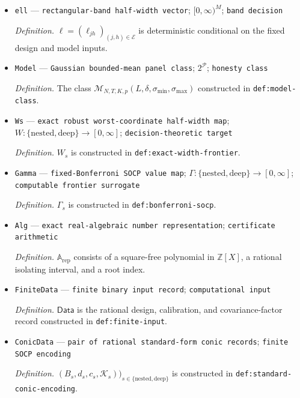 \documentclass{article}
\begin{document}
\begin{itemize}
  \par\smallskip\noindent\emph{Definition.} \(c_\alpha=\sup_{m\ge1}\{\Phi^{-1}(1-\alpha/(2m))+1\}/q_\alpha(m)\).
  \item \texttt{ell} --- \texttt{rectangular-\allowbreak{}band half-\allowbreak{}width vector}; \([0,\infty)^M\); \texttt{band decision}
  \par\smallskip\noindent\emph{Definition.} \(\ell=(\ell_{jh})_{(j,h)\in\mathcal E}\) is deterministic conditional on the fixed design and model inputs.
  \item \texttt{Model} --- \texttt{Gaussian bounded-\allowbreak{}mean panel class}; \(2^{\mathcal P}\); \texttt{honesty class}
  \par\smallskip\noindent\emph{Definition.} The class \(\mathcal M_{N,T,K,p}(L,\delta,\sigma_{\min},\sigma_{\max})\) constructed in \texttt{def:model-class}.
  \item \texttt{Ws} --- \texttt{exact robust worst-\allowbreak{}coordinate half-\allowbreak{}width map}; \(W:\{\mathrm{nested},\mathrm{deep}\}\to[0,\infty]\); \texttt{decision-\allowbreak{}theoretic target}
  \par\smallskip\noindent\emph{Definition.} \(W_s\) is constructed in \texttt{def:exact-width-frontier}.
  \item \texttt{Gamma} --- \texttt{fixed-\allowbreak{}Bonferroni SOCP value map}; \(\Gamma:\{\mathrm{nested},\mathrm{deep}\}\to[0,\infty]\); \texttt{computable frontier surrogate}
  \par\smallskip\noindent\emph{Definition.} \(\Gamma_s\) is constructed in \texttt{def:bonferroni-socp}.
  \item \texttt{Alg} --- \texttt{exact real-\allowbreak{}algebraic number representation}; \texttt{certificate arithmetic}
  \par\smallskip\noindent\emph{Definition.} \(\mathbb A_{\mathrm{rep}}\) consists of a square-free polynomial in \(\mathbb Z[X]\), a rational isolating interval, and a root index.
  \item \texttt{FiniteData} --- \texttt{finite binary input record}; \texttt{computational input}
  \par\smallskip\noindent\emph{Definition.} \(\mathsf{Data}\) is the rational design, calibration, and covariance-factor record constructed in \texttt{def:finite-input}.
  \item \texttt{ConicData} --- \texttt{pair of rational standard-\allowbreak{}form conic records}; \texttt{finite SOCP encoding}
  \par\smallskip\noindent\emph{Definition.} \((B_s,d_s,c_s,\mathcal K_s))_{s\in\{\mathrm{nested},\mathrm{deep}\}}\) is constructed in \texttt{def:standard-conic-encoding}.

\end{itemize}
\end{document}
